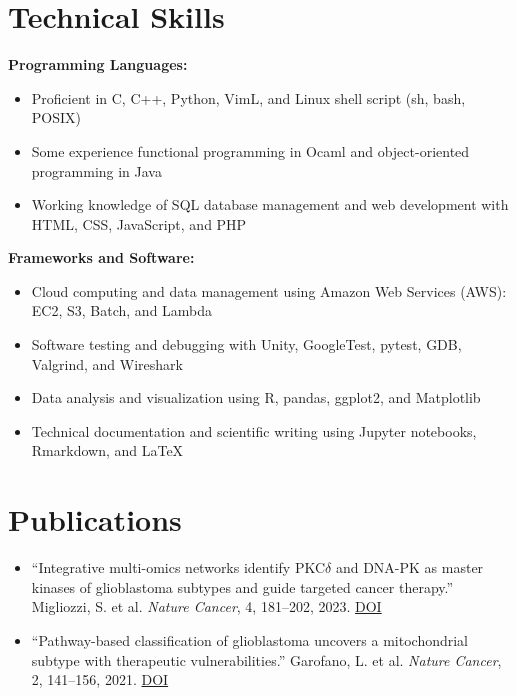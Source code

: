 \documentclass[11pt,a4paper]{article}   %
\begin{document}
\section*{Technical Skills}
\textbf{Programming Languages:}
\begin{itemize}
  \item Proficient in C, C++, Python, VimL, and Linux shell script (sh, bash, POSIX)
  \item Some experience functional programming in Ocaml and object-oriented programming in Java
  \item Working knowledge of SQL database management and web development with HTML, CSS, JavaScript, and PHP
\end{itemize}

\textbf{Frameworks and Software:}
\begin{itemize}
  \item Cloud computing and data management using Amazon Web Services (AWS): EC2, S3, Batch, and Lambda
  \item Software testing and debugging with Unity, GoogleTest, pytest, GDB, Valgrind, and Wireshark
  \item Data analysis and visualization using R, pandas, ggplot2, and Matplotlib
  \item Technical documentation and scientific writing using Jupyter notebooks, Rmarkdown, and \LaTeX
\end{itemize}

\section*{Publications}
\begin{itemize}
  \item ``Integrative multi-omics networks identify PKC$\delta$ and DNA-PK as master kinases of glioblastoma subtypes and guide targeted cancer therapy.''
    Migliozzi, S. et al. \textit{Nature Cancer}, 4, 181–202, 2023. \href{https://doi.org/10.1038/s43018-022-00510-x}{DOI}
  \item ``Pathway-based classification of glioblastoma uncovers a mitochondrial subtype with therapeutic vulnerabilities.''
    Garofano, L. et al. \textit{Nature Cancer}, 2, 141–156, 2021. \href{https://doi.org/10.1038/s43018-020-00159-4}{DOI}
\end{itemize}
\end{document}

